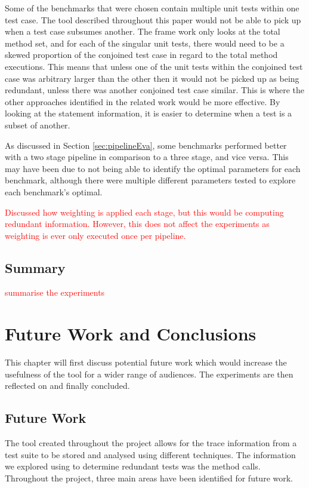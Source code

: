 \documentclass[11pt
              , a4paper
              , twoside
              , openright
              ]{report}
\newcommand\todonote[1]{\textcolor{red}{#1}}
\begin{document}
Some of the benchmarks that were chosen contain multiple unit tests within one test case. The tool described throughout this paper would not be able to pick up when a test case subsumes another. The frame work only looks at the total method set, and for each of the singular unit tests, there would need to be a skewed proportion of the conjoined test case in regard to the total method executions. This means that unless one of the unit tests within the conjoined test case was arbitrary larger than the other then it would not be picked up as being redundant, unless there was another conjoined test case similar. This is where the other approaches identified in the related work would be more effective. By looking at the statement information, it is easier to determine when a test is a subset of another.

As discussed in Section \ref{sec:pipelineEva}, some benchmarks performed better with a two stage pipeline in comparison to a three stage, and vice versa. This may have been due to not being able to identify the optimal parameters for each benchmark, although there were multiple different parameters tested to explore each benchmark's optimal. 

\todonote{Discussed how weighting is applied each stage, but this would be computing redundant information. However, this does not affect the experiments as weighting is ever only executed once per pipeline.}

\section{Summary}

\todonote{summarise the experiments} \newpage 
 \newpage \chapter{Future Work and Conclusions}\label{C:future}

This chapter will first discuss potential future work which would increase the usefulness of the tool for a wider range of audiences. The experiments are then reflected on and finally concluded. 

\section{Future Work}
The tool created throughout the project allows for the trace information from a test suite to be stored and analysed using different techniques. The information we explored using to determine redundant tests was the method calls. Throughout the project, three main areas have been identified for future work.
\end{document}
